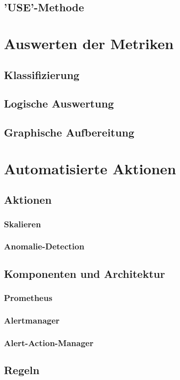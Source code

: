 \documentclass[a4paper,12pt]{scrartcl}
\begin{document}
\subsection{'USE'-Methode}

\section{Auswerten der Metriken}
\subsection{Klassifizierung}
\subsection{Logische Auswertung}
\subsection{Graphische Aufbereitung}

\section{Automatisierte Aktionen}
\subsection{Aktionen}
\subsubsection{Skalieren}
\subsubsection{Anomalie-Detection}
\subsection{Komponenten und Architektur}
\subsubsection{Prometheus}
\subsubsection{Alertmanager}
\subsubsection{Alert-Action-Manager}
\subsection{Regeln}
\end{document}
